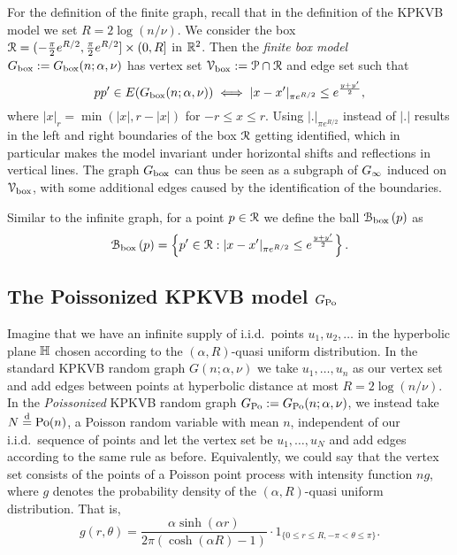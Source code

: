 For the definition of the finite graph, recall that in the definition of the KPKVB model we set $R = 2\log(n/\nu)$.
We consider the box ${\mathcal R} = (-\frac{\pi}{2}e^{R/2}, \frac{\pi}{2}e^{R/2}] \times (0, R]$ in ${\mathbb R}^2$. 
Then the \emph{finite box model} $G_{\mathrm{box}} := G_{\mathrm{box}}(n;\alpha, \nu)$ has vertex set $\mathcal{V}_{\text{box}} := \mathcal{P} \cap {\mathcal R}$ and edge set such that
\[
	pp' \in E(G_{\mathrm{box}}(n;\alpha, \nu)) \iff |x - x'|_{\pi e^{R/2}} \leq e^{\frac{y + y'}{2}},
\]
where $|x|_{r} = \min( |x|, r - |x|)$ for $-r\leq x\leq r$. Using $|.|_{\pi e^{R/2}}$ instead of $|.|$ results in the left and right boundaries of the box ${\mathcal R}$ getting identified, which in particular makes the model invariant under horizontal shifts and reflections in vertical lines. The graph $G_{\mathrm{box}}$ can thus be seen as a subgraph of $G_{\infty}$ induced on $\mathcal{V}_{\text{box}}$, with some additional edges caused by the identification of the boundaries.

Similar to the infinite graph, for a point $p \in {\mathcal R}$ we define the ball ${\mathcal B}_{\text{box}}\left(p\right)$ as
\begin{equation}\label{eq:def_ball_P_n}
	{\mathcal B}_{\text{box}}\left(p\right) = 
	\left\{p' \in {\mathcal R} : |x - x'|_{\pi e^{R/2}} \leq e^{\frac{y + y'}{2}}\right\}.
\end{equation}


\subsection{The Poissonized KPKVB model $G_{{\mathrm{Po}}}$}


Imagine that we have an infinite supply of i.i.d.~points $u_1, u_2, \dots$ in the hyperbolic plane ${\mathbb H}$ chosen according to the $(\alpha, R)$-quasi uniform distribution. In the standard KPKVB random graph $G(n;\alpha,\nu)$ we take $u_1,\dots, u_n$ as our vertex set and add edges between points at hyperbolic distance at most $R = 2\log(n/\nu)$. In the \emph{Poissonized} KPKVB random graph $G_{{\mathrm{Po}}} := G_{{\mathrm{Po}}}(n;\alpha,\nu)$, we instead take $N\stackrel{\text{d}}{=} {\mathrm{Po}}(n)$, a Poisson random variable 
with mean $n$, independent of our i.i.d.~sequence of points and let the vertex set be $u_1,\dots, u_N$ and add edges 
according to the same rule as before. Equivalently, we could say that the vertex set consists of the points of a Poisson point process with intensity function $n g$, where $g$ denotes the probability density of the $(\alpha,R)$-quasi uniform distribution. That is,
\begin{equation}\label{eq:def_quasi_uniform_density}
	g(r,\theta) = \frac{\alpha\sinh(\alpha r)}{2\pi(\cosh(\alpha R) - 1)} \cdot 1_{\{0\leq r\leq R, -\pi<\theta\leq \pi\}}.
\end{equation}


